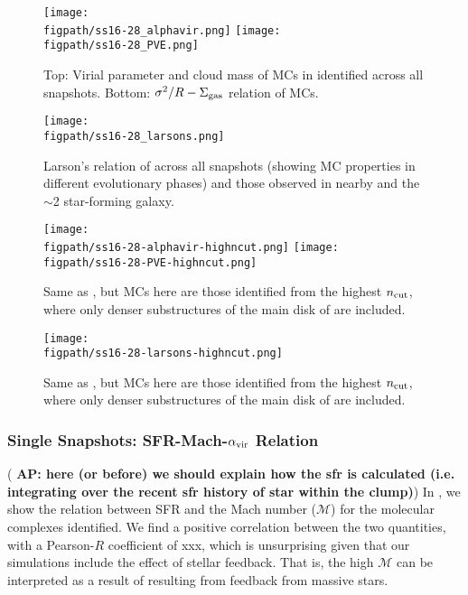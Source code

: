 \documentclass[apj]{emulateapj} %
\newcommand{\AP}[1]{({\bf \color{apcolor} AP: #1})}
\begin{document}
{%


\begin{figure*}[htbp]
\centering
\texttt{[image: \\figpath/ss16-28\_alphavir.png]}
\texttt{[image: \\figpath/ss16-28\_PVE.png]}
\caption{
Top: Virial parameter and cloud mass of MCs in \flower identified across all snapshots.
Bottom: $\sigma^2/R - \Sigma_{\rm gas}$ relation of MCs.
\label{fig:alpha16-28}}
\end{figure*}

\begin{figure*}[htbp]
\centering
\texttt{[image: \\figpath/ss16-28\_larsons.png]}
\caption{
Larson's relation of \flower across all snapshots (showing MC properties in different evolutionary
phases) and
those observed in nearby and the \z$\sim$2 star-forming galaxy.
\label{fig:larsons16-28}}
\end{figure*}


\begin{figure*}[htbp]
\centering
\texttt{[image: \\figpath/ss16-28-alphavir-highncut.png]}
\texttt{[image: \\figpath/ss16-28-PVE-highncut.png]}
\caption{
Same as , but MCs here are those identified from the highest $n_{\rm cut}$,
where only denser substructures of the main disk of \flower are included.
\label{fig:alpha16-28-highncut}}
\end{figure*}

\begin{figure*}[htbp]
\centering
\texttt{[image: \\figpath/ss16-28-larsons-highncut.png]}
\caption{
Same as , but MCs here are those identified from the highest $n_{\rm cut}$,
where only denser substructures of the main disk of \flower are included.
\label{fig:larsons16-28-highncut}}
\end{figure*}




\subsubsection{Single Snapshots: SFR-Mach-$\alpha_{\rm vir}$ Relation}
\AP{here (or before) we should explain how the sfr is calculated (i.e. integrating over the recent sfr history of star within the clump)}
In \Fig{}, we show the relation between SFR and the Mach number ($\mathcal{M}$) for the molecular
complexes identified.
We find a positive correlation between the two quantities, with a Pearson-$R$ coefficient of xxx,
which is unsurprising given that our simulations include the effect of stellar feedback. That is,
the high $\mathcal{M}$ can be interpreted as a result of \SF resulting from feedback from
massive stars.


}
\end{document}
